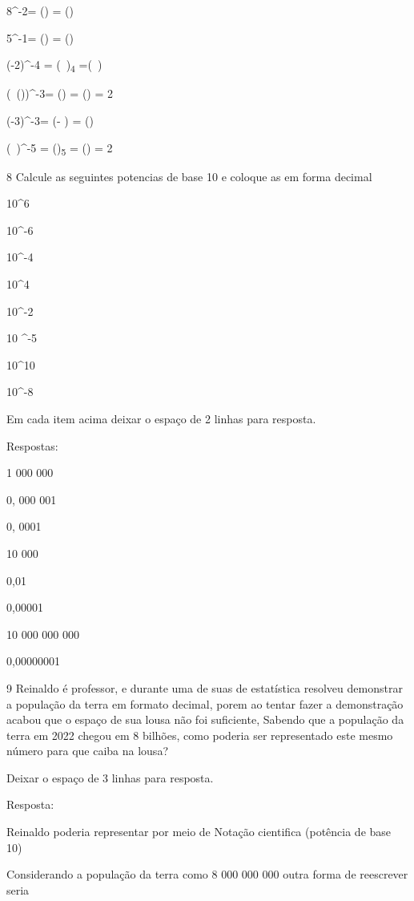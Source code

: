 \item 8^-2= () = ()
\item 5^-1= () = ()
\item (-2)^-4 = (\ )\textsubscript{4} =(\ )

\item (\ ())^-3= () =
() = 2

\item (-3)^-3= (- ) = ()
\item (\ )^-5 =
()\textsubscript{5} = () = 2

\num{8} Calcule as seguintes potencias de base 10 e coloque as em forma
decimal

\item 10^6
\item 10^-6
\item 10^-4
\item 10^4
\item 10^-2
\item 10 ^-5
\item 10^10
\item 10^-8

Em cada item acima deixar o espaço de 2 linhas para resposta.

Respostas:

\item 1 000 000
\item 0, 000 001
\item 0, 0001
\item 10 000
\item 0,01
\item 0,00001
\item 10 000 000 000
\item 0,00000001

\num{9} Reinaldo é professor, e durante uma de suas de estatística resolveu
demonstrar a população da terra em formato decimal, porem ao tentar
fazer a demonstração acabou que o espaço de sua lousa não foi
suficiente, Sabendo que a população da terra em 2022 chegou em 8
bilhões, como poderia ser representado este mesmo número para que caiba
na lousa?

Deixar o espaço de 3 linhas para resposta.

Resposta:

Reinaldo poderia representar por meio de Notação cientifica (potência de
base 10)

Considerando a população da terra como 8 000 000 000 outra forma de
reescrever seria

